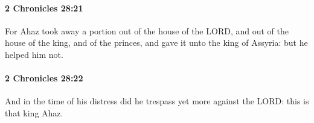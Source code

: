 		\paragraph{2 Chronicles 28:21} %
			\label{2CHRONICLES-28-21}

			For Ahaz took away a portion out of the house of the LORD, and out of the house of the king, and of the princes, and gave it unto the king of Assyria: but he helped him not.


		\paragraph{2 Chronicles 28:22} %
			\label{2CHRONICLES-28-22}

			And in the time of his distress did he trespass yet more against the LORD: this is that king Ahaz.


